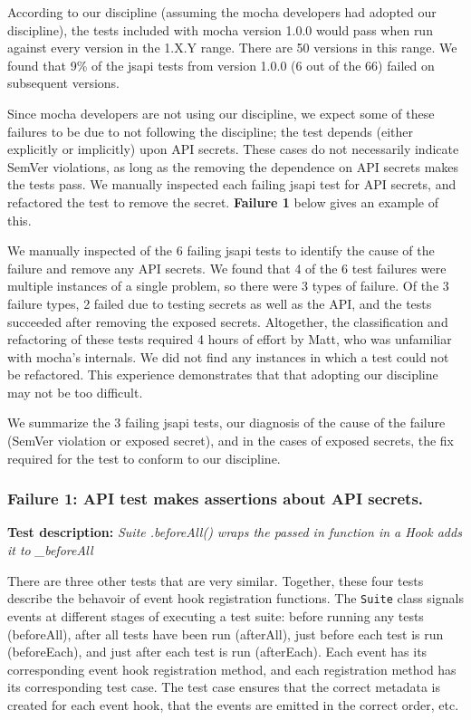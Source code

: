 According to our discipline (assuming the mocha developers had adopted
our discipline), the tests included with mocha version 1.0.0 would
pass when run against every version in the 1.X.Y range. There are 50
versions in this range. We found that 9\% of the jsapi tests from
version 1.0.0 (6 out of the 66) failed on subsequent versions.

Since mocha developers are not using our discipline, we expect some of
these failures to be due to not following the discipline; the test
depends (either explicitly or implicitly) upon API secrets. These
cases do not necessarily indicate SemVer violations, as long as the
removing the dependence on API secrets makes the tests pass. We
manually inspected each failing jsapi test for API secrets, and
refactored the test to remove the secret. {\bf Failure 1} below gives
an example of this.

We manually inspected of the 6 failing jsapi tests to identify the
cause of the failure and remove any API secrets. We found that 4 of
the 6 test failures were multiple instances of a single problem, so
there were 3 types of failure. Of the 3 failure types, 2 failed due to
testing secrets as well as the API, and the tests succeeded after
removing the exposed secrets. Altogether, the classification and
refactoring of these tests required 4 hours of effort by Matt, who was
unfamiliar with mocha's internals. We did not find any instances in
which a test could not be refactored. This experience demonstrates
that that adopting our discipline may not be too difficult.

We summarize the 3 failing jsapi tests, our diagnosis of the cause of
the failure (SemVer violation or exposed secret), and in the cases of
exposed secrets, the fix required for the test to conform to our
discipline.

\subsubsection{Failure 1: API test makes assertions about API secrets.}
{\bf Test description: } {\em Suite .beforeAll() wraps the passed in
function in a Hook adds it to \_beforeAll}
\label{sec:failure1}

There are three other tests that are very similar. Together, these
four tests describe the behavoir of event hook registration
functions. The {\tt Suite} class signals events at different stages of
executing a test suite: before running any tests (beforeAll), after
all tests have been run (afterAll), just before each test is run
(beforeEach), and just after each test is run (afterEach). Each event
has its corresponding event hook registration method, and each
registration method has its corresponding test case. The test case
ensures that the correct metadata is created for each event hook, that
the events are emitted in the correct order, etc.

